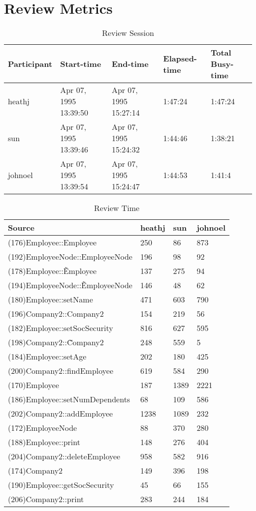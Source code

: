 \section{Review Metrics}
\begin{table}[hb]
\begin{center}
\begin{tabular}{|l|l|l|l|l|}
\hline
Participant & Start-time & End-time & Elapsed-time & Total Busy-time \\
\hline
heathj & Apr 07, 1995 13:39:50 & Apr 07, 1995 15:27:14 & 1:47:24 & 1:47:24 \\
sun & Apr 07, 1995 13:39:46 & Apr 07, 1995 15:24:32 & 1:44:46 & 1:38:21 \\
johnoel & Apr 07, 1995 13:39:54 & Apr 07, 1995 15:24:47 & 1:44:53 & 1:41:4 \\
\hline
\end{tabular}
\end{center}
\caption{Review Session}
\end{table}


\begin{table}[hb]
\begin{center}
\begin{tabular}{|l|l|l|l|}
\hline
Source & heathj & sun & johnoel\\
\hline
(176)Employee::Employee & 250 & 86 & 873\\
(192)EmployeeNode::EmployeeNode & 196 & 98 & 92\\
(178)Employee::\~Employee & 137 & 275 & 94\\
(194)EmployeeNode::\~EmployeeNode & 146 & 48 & 62\\
(180)Employee::setName & 471 & 603 & 790\\
(196)Company2::Company2 & 154 & 219 & 56\\
(182)Employee::setSocSecurity & 816 & 627 & 595\\
(198)Company2::\~Company2 & 248 & 559 & 5\\
(184)Employee::setAge & 202 & 180 & 425\\
(200)Company2::findEmployee & 619 & 584 & 290\\
(170)Employee & 187 & 1389 & 2221\\
(186)Employee::setNumDependents & 68 & 109 & 586\\
(202)Company2::addEmployee & 1238 & 1089 & 232\\
(172)EmployeeNode & 88 & 370 & 280\\
(188)Employee::print & 148 & 276 & 404\\
(204)Company2::deleteEmployee & 958 & 582 & 916\\
(174)Company2 & 149 & 396 & 198\\
(190)Employee::getSocSecurity & 45 & 66 & 155\\
(206)Company2::print & 283 & 244 & 184\\
\hline
\end{tabular}
\end{center}
\caption{Review Time}
\end{table}


